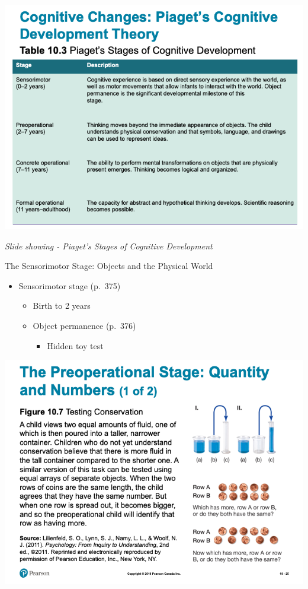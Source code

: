 \documentclass[
]{book}
\providecommand{\tightlist}{%
  \setlength{\itemsep}{0pt}\setlength{\parskip}{0pt}}
\begin{document}
\begin{reflect}
\includegraphics{assets/unit_3/slide_23.png}

\emph{Slide showing - Piaget's Stages of Cognitive Development}

The Sensorimotor Stage: Objects and the Physical World

\begin{itemize}
\tightlist
\item
  Sensorimotor stage (p.~375)

  \begin{itemize}
  \tightlist
  \item
    Birth to 2 years\\
  \item
    Object permanence (p.~376)

    \begin{itemize}
    \tightlist
    \item
      Hidden toy test
    \end{itemize}
  \end{itemize}
\end{itemize}

\includegraphics{assets/unit_3/slide_25.png}


\end{reflect}
\end{document}
